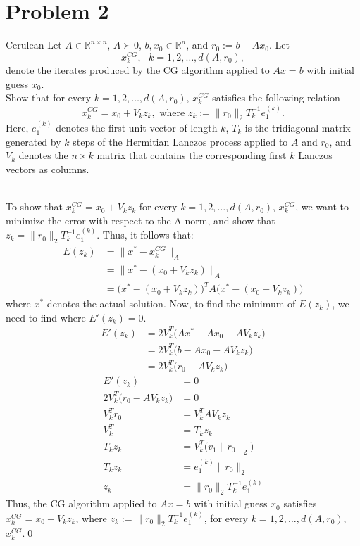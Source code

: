 \documentclass[12pt]{article}
\def\R{\mathbb{R}}
\begin{document}
\section{Problem 2} 
\begin{mybox}{Cerulean}{}
Let $A\in\R^{n\times n}$, $A \succ 0$, $b, x_0 \in \R^n$, and $r_0 := b- Ax_0$.  Let
$$x_k^{CG}, \text{ } k = 1, 2, \dots, d(A,r_0),$$
denote the iterates produced by the CG algorithm applied to $Ax=b$ with initial guess $x_0$.\\
Show that for every $k=1,2,\dots,d(A,r_0)$, $x_k^{CG}$ satisfies the following relation
$$x_k^{CG} = x_0 + V_kz_k, \text{ where } z_k :=\|r_0\|_2T_k^{-1}e_1^{(k)}.$$
Here, $e_1^{(k)}$ denotes the first unit vector of length $k$, $T_k$ is the tridiagonal matrix generated by $k$ steps of the Hermitian Lanczos process applied to $A$ and $r_0$, and $V_k$ denotes the $n\times k$ matrix that contains the corresponding first $k$ Lanczos vectors as columns.
\end{mybox}
\text{ }\\
\noindent
To show that $x_k^{CG} = x_0 + V_kz_k$ for every $k=1,2,\dots,d(A,r_0)$, $x_k^{CG}$, we want to minimize the error with respect to the A-norm, and show that $z_k =\|r_0\|_2T_k^{-1}e_1^{(k)}$.  Thus, it follows that:
\begin{align*}
E(z_k) &= \| x^* - x_k^{CG}\|_A \\
&= \| x^* - (x_0 + V_kz_k)\|_A \\
&= \big(x^* - (x_0 + V_kz_k)\big)^T A \big(x^* - (x_0 + V_kz_k)\big) 
\end{align*}
where $x^*$ denotes the actual solution.  Now, to find the minimum of $E(z_k)$, we need to find where $E'(z_k) = 0$.
\begin{align*}
E'(z_k) &= 2V_k^T\big(Ax^* - Ax_0 - AV_kz_k\big) \\
&= 2V_k^T\big(b - Ax_0 - AV_kz_k\big) \\
&= 2V_k^T\big(r_0 - AV_kz_k\big)
\end{align*}
\begin{align*}
E'(z_k) &= 0 \\
2V_k^T\big(r_0 - AV_kz_k\big) &= 0 \\
V_k^Tr_0 &= V_k^TAV_kz_k \\
V_k^T &= T_kz_k \\
T_kz_k &= V_k^T\big(v_1\|r_0\|_2\big) \\
T_kz_k &= e_1^{(k)}\|r_0\|_2 \\
z_k &= \|r_0\|_2T_k^{-1}e_1^{(k)}
\end{align*}
Thus, the CG algorithm applied to $Ax=b$ with initial guess $x_0$ satisfies $x_k^{CG} = x_0 + V_kz_k$, where $z_k :=\|r_0\|_2T_k^{-1}e_1^{(k)}$, for every $k=1,2,\dots,d(A,r_0)$, $x_k^{CG}$.\qed\\
\end{document}
